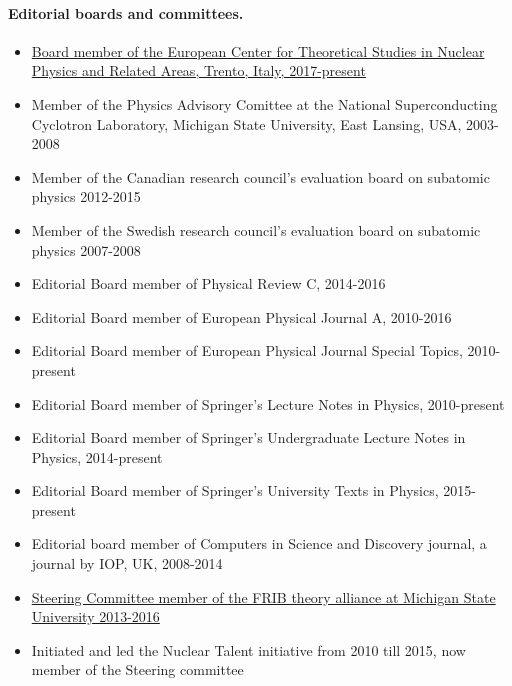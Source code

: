 \documentclass[a4wide,10pt]{article}
\begin{document}
\paragraph{Editorial boards and committees.}
\begin{itemize}
\item \href{{http://ectstar.eu/}}{Board member of the European Center for Theoretical Studies in Nuclear Physics and Related Areas, Trento, Italy, 2017-present}

\item Member of the Physics Advisory Comittee at the National Superconducting Cyclotron Laboratory, Michigan State University, East Lansing, USA, 2003-2008

\item Member of the Canadian research council's evaluation board on subatomic physics 2012-2015

\item Member of the Swedish research council's evaluation board on subatomic physics 2007-2008

\item Editorial Board member of Physical Review C, 2014-2016

\item Editorial Board member of European Physical Journal A, 2010-2016

\item Editorial Board member of European Physical Journal Special Topics, 2010-present

\item Editorial Board member of Springer's Lecture Notes in Physics, 2010-present

\item Editorial Board member of Springer's Undergraduate Lecture Notes in Physics, 2014-present

\item Editorial Board member of Springer's University Texts  in Physics, 2015-present

\item Editorial board member of Computers in Science and Discovery journal, a journal by IOP, UK, 2008-2014

\item \href{{http://fribtheoryalliance.org/}}{Steering Committee member of the FRIB theory alliance at Michigan State University 2013-2016}

\item  Initiated and led the Nuclear Talent initiative from 2010 till 2015, now member of the Steering committee


\end{itemize}
\end{document}
